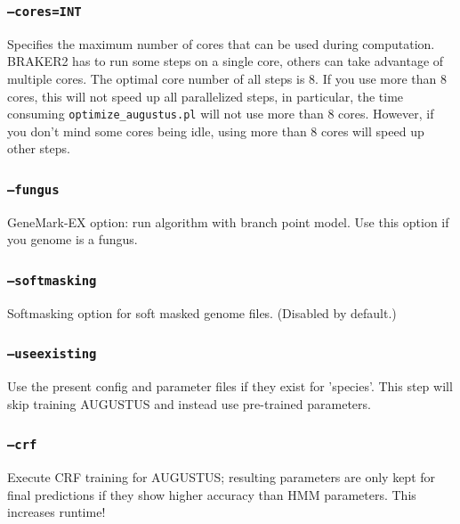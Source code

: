 \documentclass[]{article}
\begin{document}
\hypertarget{coresint}{\subsubsection{\texorpdfstring{\texttt{–cores=INT}}{--cores=INT}}\label{coresint}}

Specifies the maximum number of cores that can be used during
computation. BRAKER2 has to run some steps on a single core, others can
take advantage of multiple cores. The optimal core number of all steps
is 8. If you use more than 8 cores, this will not speed up all
parallelized steps, in particular, the time consuming
\texttt{optimize\_augustus.pl} will not use more than 8 cores. However,
if you don't mind some cores being idle, using more than 8 cores will
speed up other steps.

\hypertarget{fungus}{\subsubsection{\texorpdfstring{\texttt{–fungus}}{--fungus}}\label{fungus}}

GeneMark-EX option: run algorithm with branch point model. Use this
option if you genome is a fungus.

\hypertarget{softmasking}{\subsubsection{\texorpdfstring{\texttt{–softmasking}}{--softmasking}}\label{softmasking}}

Softmasking option for soft masked genome files. (Disabled by default.)

\hypertarget{useexisting}{\subsubsection{\texorpdfstring{\texttt{–useexisting}}{--useexisting}}\label{useexisting}}

Use the present config and parameter files if they exist for 'species'.
This step will skip training AUGUSTUS and instead use pre-trained
parameters.

\hypertarget{crf}{\subsubsection{\texorpdfstring{\texttt{–crf}}{--crf}}\label{crf}}

Execute CRF training for AUGUSTUS; resulting parameters are only kept
for final predictions if they show higher accuracy than HMM parameters.
This increases runtime!
\end{document}

